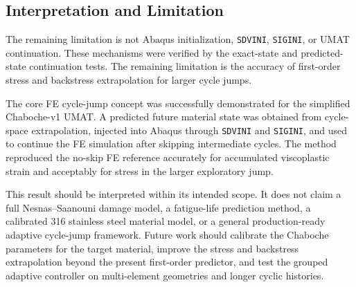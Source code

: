 \subsection{Interpretation and Limitation}

The remaining limitation is not Abaqus initialization, \texttt{SDVINI}, \texttt{SIGINI}, or UMAT continuation. These mechanisms were verified by the exact-state and predicted-state continuation tests. The remaining limitation is the accuracy of first-order stress and backstress extrapolation for larger cycle jumps.

The core FE cycle-jump concept was successfully demonstrated for the simplified Chaboche-v1 UMAT. A predicted future material state was obtained from cycle-space extrapolation, injected into Abaqus through \texttt{SDVINI} and \texttt{SIGINI}, and used to continue the FE simulation after skipping intermediate cycles. The method reproduced the no-skip FE reference accurately for accumulated viscoplastic strain and acceptably for stress in the larger exploratory jump.

This result should be interpreted within its intended scope. It does not claim a full Nesnas--Saanouni damage model, a fatigue-life prediction method, a calibrated 316 stainless steel material model, or a general production-ready adaptive cycle-jump framework. Future work should calibrate the Chaboche parameters for the target material, improve the stress and backstress extrapolation beyond the present first-order predictor, and test the grouped adaptive controller on multi-element geometries and longer cyclic histories.
